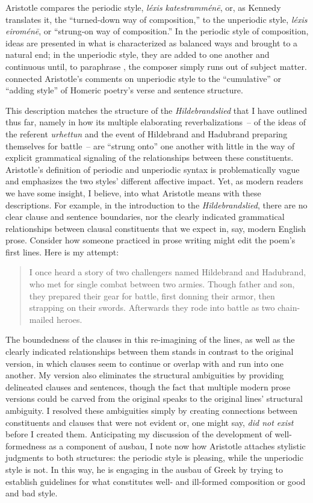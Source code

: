 \noindent Aristotle compares the periodic style, \textit{léxis katestramménē}, or, as Kennedy translates it, the “turned-down way of composition,” to the unperiodic style, \textit{léxis eiroménē}, or “strung-on way of composition.” In the periodic style of composition, ideas are presented in what is characterized as balanced ways and brought to a natural end; in the unperiodic style, they are added to one another and continuous until, to paraphrase \citet[90]{Fowler1982}, the composer simply runs out of subject matter. \citet[252]{Parry1971} connected Aristotle’s comments on unperiodic style to the “cumulative” or “adding style” of Homeric poetry’s verse and sentence structure.

This description matches the structure of the \textit{Hildebrandslied} that I have outlined thus far, namely in how its multiple elaborating reverbalizations~-- of the ideas of the referent \textit{urhettun} and the event of Hildebrand and Hadubrand preparing themselves for battle~-- are “strung onto” one another with little in the way of explicit grammatical signaling of the relationships between these constituents. Aristotle’s definition of periodic and unperiodic syntax is problematically vague and emphasizes the two styles’ different affective impact. Yet, as modern readers we have some insight, I believe, into what Aristotle means with these descriptions. For example, in the introduction to the \textit{Hildebrandslied}, there are no clear clause and sentence boundaries, nor the clearly indicated grammatical relationships between clausal constituents that we expect in, say, modern English prose. Consider how someone practiced in prose writing might edit the poem’s first lines. Here is my attempt:

\begin{quote}
I once heard a story of two challengers named Hildebrand and Hadubrand, who met for single combat between two armies. Though father and son, they prepared their gear for battle, first donning their armor, then strapping on their swords. Afterwards they rode into battle as two chain-mailed heroes.
\end{quote}

\noindent The boundedness of the clauses in this re-imagining of the lines, as well as the clearly indicated relationships between them stands in contrast to the original version, in which clauses seem to continue or overlap with and run into one another. My version also eliminates the structural ambiguities by providing delineated clauses and sentences, though the fact that multiple modern prose versions could be carved from the original speaks to the original lines’ structural ambiguity. I resolved these ambiguities simply by creating connections between constituents and clauses that were not evident or, one might say, \textit{did not exist} before I created them. Anticipating my  discussion of the development of well-formedness as a component of ausbau, I note now how Aristotle attaches stylistic judgments to both structures: the periodic style is pleasing, while the unperiodic style is not. In this way, he is engaging in the ausbau of Greek by trying to establish guidelines for what constitutes well- and ill-formed composition or good and bad style.

